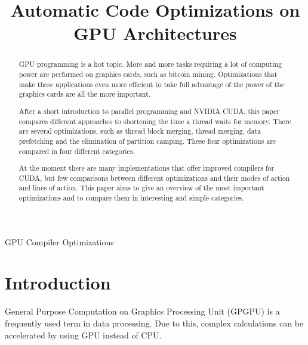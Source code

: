 \documentclass[conference]{IEEEtran}
\begin{document}
\title{Automatic Code Optimizations on GPU Architectures}

\author{
}


\maketitle

\begin{abstract}
	GPU programming is a hot topic. More and more tasks requiring a lot of computing power are performed on graphics cards, such as bitcoin mining. Optimizations that make these applications even more efficient to take full advantage of the power of the graphics cards are all the more important.
	
	After a short introduction to parallel programming and NVIDIA CUDA, this paper compares different approaches to shortening the time a thread waits for memory. There are several optimizations, such as thread block merging, thread merging, data prefetching and the elimination of partition camping. These four optimizations are compared in four different categories.
	
	At the moment there are many implementations that offer improved compilers for CUDA, but few comparisons between different optimizations and their modes of action and lines of action. This paper aims to give an overview of the most important optimizations and to compare them in interesting and simple categories.
\end{abstract}

\begin{IEEEkeywords}
GPU Compiler Optimizations
\end{IEEEkeywords}



\section{Introduction}


	General Purpose Computation on Graphics Processing Unit (GPGPU) is a frequently used term in data processing. Due to this, complex calculations can be accelerated by using GPU instead of CPU.
	
\end{document}
